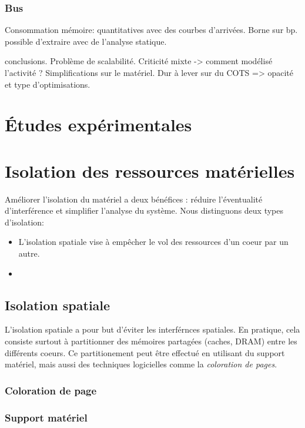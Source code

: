 \subsubsection{Bus}

Consommation mémoire: quantitatives avec des courbes d'arrivées. Borne sur bp. possible d'extraire avec de l'analyse statique.

conclusions. Problème de scalabilité. Criticité mixte -> comment modélisé l'activité ? Simplifications sur le matériel. Dur à lever sur du COTS => opacité et type d'optimisations.


\section{Études expérimentales}



\section{Isolation des ressources matérielles}


Améliorer l'isolation du matériel a deux bénéfices : réduire l'éventualité d'interférence et simplifier l'analyse du système.
Nous distinguons deux types d'isolation:
\begin{itemize}
	\item L'isolation spatiale vise à empêcher le vol des ressources d'un coeur par un autre.
	\item 
\end{itemize}

\subsection{Isolation spatiale}

L'isolation spatiale a pour but d'éviter les interférnces spatiales.
En pratique, cela consiste surtout à partitionner des mémoires partagées (caches, DRAM) entre les différents coeurs.
Ce partitionement peut être effectué en utilisant du support matériel, mais aussi des techniques logicielles comme la \emph{coloration de pages}.

\subsubsection{Coloration de page}


\subsubsection{Support matériel}

